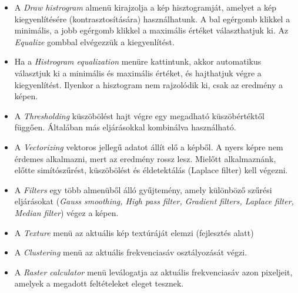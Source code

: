 \documentclass[a4paper,12pt]{article}
\begin{document}
\begin{itemize}
	
	\item A \textit{Draw histrogram} almenü kirajzolja a kép hisztogramját, amelyet a kép kiegyenlítésére (kontrasztosítására) használhatunk. A bal egérgomb klikkel a minimális, a jobb egérgomb klikkel a maximális értéket választhatjuk ki. Az \textit{Equalize} gombbal elvégezzük a kiegyenlítést. 
%	
	\item Ha a \textit{Histrogram equalization} menüre kattintunk, akkor automatikus választjuk ki a minimális és maximális értéket, és hajthatjuk végre a kiegyenlítést. Ilyenkor a hisztogram nem rajzolódik ki, csak az eredmény a képen.
	
	\item A \textit{Thresholding} küszöbölést hajt végre egy megadható küszöbértéktől függően. Általában más eljárásokkal kombinálva használható.
	
	\item A \textit{Vectorizing} vektoros jellegű adatot állít elő a képből. A nyers képre nem érdemes alkalmazni, mert az eredmény rossz lesz. Mielőtt alkalmaznánk, előtte simítószűrést, küszöbölést és éldetektálás (Laplace filter) kell végezni. 
		
	\item A \textit{Filters} egy több almenüből álló gyűjtemény, amely különböző szűrési eljárásokat (\textit{Gauss smoothing, High pass filter, Gradient filters, Laplace filter, Median filter}) végez a képen. 
		
	\item A \textit{Texture} menü az aktuális kép textúráját elemzi (fejlesztés alatt)
	
	
	\item A \textit{Clustering} menü az aktuális frekvenciasáv  osztályozását végzi.
	
	\item A \textit{Raster calculator} menü leválogatja az aktuális frekvenciasáv azon pixeljeit, amelyek a megadott  feltételeket eleget tesznek.
	

\end{itemize}
	
\end{document}
